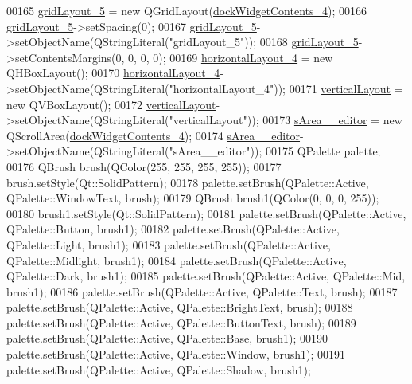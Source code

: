 \begin{DoxyCode}
00165         \hyperlink{a00079_ac56612bd2595405ccbdfe4aae45eccd7}{gridLayout\_5} = \textcolor{keyword}{new} QGridLayout(\hyperlink{a00079_a20ad5110f0fb7b329d067d354f8c9409}{dockWidgetContents\_4});
00166         \hyperlink{a00079_ac56612bd2595405ccbdfe4aae45eccd7}{gridLayout\_5}->setSpacing(0);
00167         \hyperlink{a00079_ac56612bd2595405ccbdfe4aae45eccd7}{gridLayout\_5}->setObjectName(QStringLiteral(\textcolor{stringliteral}{"gridLayout\_5"}));
00168         \hyperlink{a00079_ac56612bd2595405ccbdfe4aae45eccd7}{gridLayout\_5}->setContentsMargins(0, 0, 0, 0);
00169         \hyperlink{a00079_a42671894c25bd8dfcc6c0a1f8689ecb8}{horizontalLayout\_4} = \textcolor{keyword}{new} QHBoxLayout();
00170         \hyperlink{a00079_a42671894c25bd8dfcc6c0a1f8689ecb8}{horizontalLayout\_4}->setObjectName(QStringLiteral(\textcolor{stringliteral}{"horizontalLayout\_4"}));
00171         \hyperlink{a00079_a11b9c1ae90724f0bcd67c76045c93704}{verticalLayout} = \textcolor{keyword}{new} QVBoxLayout();
00172         \hyperlink{a00079_a11b9c1ae90724f0bcd67c76045c93704}{verticalLayout}->setObjectName(QStringLiteral(\textcolor{stringliteral}{"verticalLayout"}));
00173         \hyperlink{a00079_a6f79b6b1fe81457d76b076a543ee4089}{sArea\_\_editor} = \textcolor{keyword}{new} QScrollArea(\hyperlink{a00079_a20ad5110f0fb7b329d067d354f8c9409}{dockWidgetContents\_4});
00174         \hyperlink{a00079_a6f79b6b1fe81457d76b076a543ee4089}{sArea\_\_editor}->setObjectName(QStringLiteral(\textcolor{stringliteral}{"sArea\_\_editor"}));
00175         QPalette palette;
00176         QBrush brush(QColor(255, 255, 255, 255));
00177         brush.setStyle(Qt::SolidPattern);
00178         palette.setBrush(QPalette::Active, QPalette::WindowText, brush);
00179         QBrush brush1(QColor(0, 0, 0, 255));
00180         brush1.setStyle(Qt::SolidPattern);
00181         palette.setBrush(QPalette::Active, QPalette::Button, brush1);
00182         palette.setBrush(QPalette::Active, QPalette::Light, brush1);
00183         palette.setBrush(QPalette::Active, QPalette::Midlight, brush1);
00184         palette.setBrush(QPalette::Active, QPalette::Dark, brush1);
00185         palette.setBrush(QPalette::Active, QPalette::Mid, brush1);
00186         palette.setBrush(QPalette::Active, QPalette::Text, brush);
00187         palette.setBrush(QPalette::Active, QPalette::BrightText, brush);
00188         palette.setBrush(QPalette::Active, QPalette::ButtonText, brush);
00189         palette.setBrush(QPalette::Active, QPalette::Base, brush1);
00190         palette.setBrush(QPalette::Active, QPalette::Window, brush1);
00191         palette.setBrush(QPalette::Active, QPalette::Shadow, brush1);

\end{DoxyCode}
